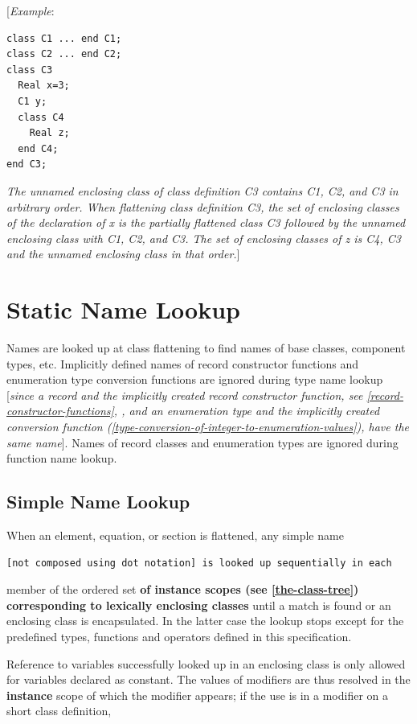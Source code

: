 \documentclass[10pt,a4paper]{report}
\def\doublelabel#1{\label{#1}\hypertarget{#1}{}}
\begin{document}
{[}\emph{Example}:
\begin{lstlisting}[language=Modelica]
class C1 ... end C1;
class C2 ... end C2;
class C3
  Real x=3;
  C1 y;
  class C4
    Real z;
  end C4;
end C3;
\end{lstlisting}

\emph{The unnamed enclosing class of class definition C3 contains C1,
C2, and C3 in arbitrary order. When flattening class definition C3, the
set of enclosing classes of the declaration of x is the partially
flattened class C3 followed by the unnamed enclosing class with C1, C2,
and C3. The set of enclosing classes of z is C4, C3 and the unnamed
enclosing class in that order.}{]}

\section{Static Name Lookup}\doublelabel{static-name-lookup}

Names are looked up at class flattening to find names of base classes,
component types, etc. Implicitly defined names of record constructor
functions and enumeration type conversion functions are ignored during
type name lookup {[}\emph{since a record and the implicitly created
record constructor function, see \ref{record-constructor-functions}, , and an
enumeration type and the implicitly created conversion function
(\ref{type-conversion-of-integer-to-enumeration-values}), have the same name}{]}. Names of record
classes and enumeration types are ignored during function name lookup.

\subsection{Simple Name Lookup}\doublelabel{simple-name-lookup}

When an element, equation, or section is flattened, any simple name
\begin{lstlisting}[language=modelica]
  [not composed using dot notation] is looked up sequentially in each
\end{lstlisting}
member of the ordered set \textbf{of instance scopes (see 
\ref{the-class-tree}) corresponding to lexically enclosing classes} until a
match is found or an enclosing class is encapsulated. In the latter case
the lookup stops except for the predefined types, functions and
operators defined in this specification.

Reference to variables successfully looked up in an enclosing class is
only allowed for variables declared as constant. The values of modifiers
are thus resolved in the \textbf{instance} scope of which the modifier
appears; if the use is in a modifier on a short class definition,
\end{document}

